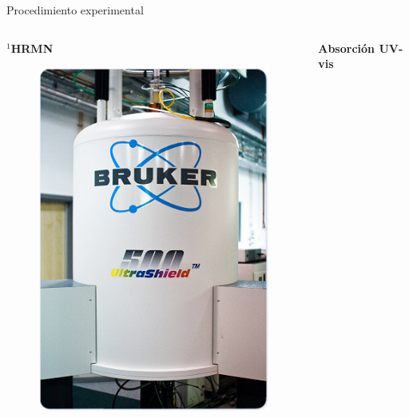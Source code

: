 \documentclass[handout]{beamer}
\begin{document}
\begin{frame}{Procedimiento experimental}
	\footnotesize
	\begin{columns}
		\begin{column}{0.2\linewidth}
			\textbf{$^1$HRMN}
			\begin{figure}[h]
				\centering
				\includegraphics[width=\textwidth]{sources/bruker}
			\end{figure}
		\end{column}
		\begin{column}{0.25\linewidth}
			\textbf{Absorci\'on UV-vis}
			\begin{figure}[h]
				\centering

\end{figure}
\end{column}
\end{columns}
\end{frame}
\end{document}
